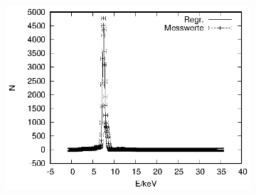 \begin{figure}[!h]
\begin{subfigure}[h]{0.5\textwidth}
  \end{subfigure}%
  \begin{subfigure}[h]{0.5\textwidth}
    \centering
    \includegraphics{data/Massenanteil/ni.eps}
  \end{subfigure}
\end{figure}

\newpage

